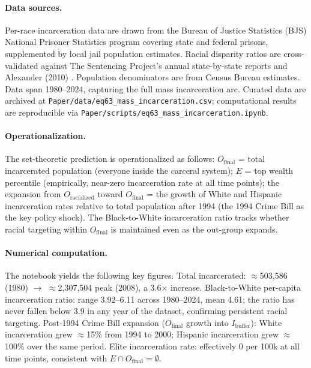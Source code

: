 \paragraph{Data sources.}
Per-race incarceration data are drawn from the Bureau of Justice Statistics (BJS) National Prisoner Statistics program \cite{bjs_incarceration_race} covering state and federal prisons, supplemented by local jail population estimates. Racial disparity ratios are cross-validated against The Sentencing Project's annual state-by-state reports \cite{sentencing_project} and Alexander (2010) \cite{alexander}. Population denominators are from Census Bureau estimates. Data span 1980--2024, capturing the full mass incarceration arc. Curated data are archived at \texttt{Paper/data/eq63\_mass\_incarceration.csv}; computational results are reproducible via \texttt{Paper/scripts/eq63\_mass\_incarceration.ipynb}.

\paragraph{Operationalization.}
The set-theoretic prediction is operationalized as follows: $O_{\text{final}}$ = total incarcerated population (everyone inside the carceral system); $E$ = top wealth percentile (empirically, near-zero incarceration rate at all time points); the expansion from $O_{\text{racialized}}$ toward $O_{\text{final}}$ = the growth of White and Hispanic incarceration rates relative to total population after 1994 (the 1994 Crime Bill as the key policy shock). The Black-to-White incarceration ratio tracks whether racial targeting within $O_{\text{final}}$ is maintained even as the out-group expands.

\paragraph{Numerical computation.}
The notebook yields the following key figures. Total incarcerated: $\approx$503,586 (1980) $\rightarrow$ $\approx$2,307,504 peak (2008), a 3.6$\times$ increase. Black-to-White per-capita incarceration ratio: range 3.92--6.11 across 1980--2024, mean 4.61; the ratio has never fallen below 3.9 in any year of the dataset, confirming persistent racial targeting. Post-1994 Crime Bill expansion ($O_{\text{final}}$ growth into $I_{\text{buffer}}$): White incarceration grew $\approx$15\% from 1994 to 2000; Hispanic incarceration grew $\approx$100\% over the same period. Elite incarceration rate: effectively 0 per 100k at all time points, consistent with $E \cap O_{\text{final}} = \emptyset$.

